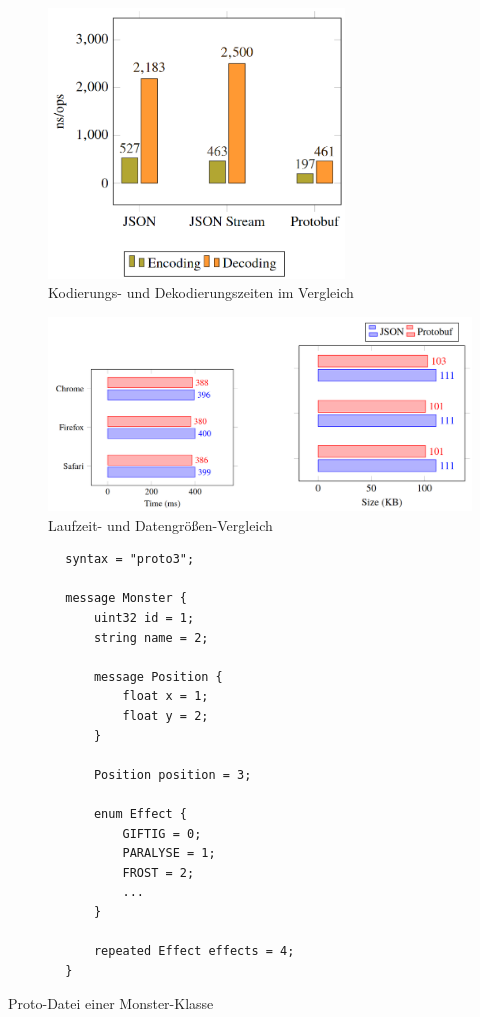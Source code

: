 \begin{figure}[htp]
    \centering
    \includegraphics[width=0.7\textwidth]{images/protobuf_time.png}
    \caption{Kodierungs- und Dekodierungszeiten im Vergleich\cite{currier2022protocol}}
    \label{fig:protobufTime}
\end{figure}

\begin{figure}[htp]
    \centering
    \includegraphics[width=1\textwidth]{images/protobuf_browser.png}
    \caption{Laufzeit- und Datengrößen-Vergleich\cite{currier2022protocol}}
    \label{fig:protobufBrowser}
\end{figure}

\begin{listing}[htp]
    \begin{verbatim} 
        syntax = "proto3";
        
        message Monster {
            uint32 id = 1;
            string name = 2;

            message Position {
                float x = 1;
                float y = 2;
            }

            Position position = 3;

            enum Effect {
                GIFTIG = 0;
                PARALYSE = 1;
                FROST = 2;
                ...
            }

            repeated Effect effects = 4;
        }
    \end{verbatim}
    \caption{Proto-Datei einer Monster-Klasse}
    \label{lst:protoExp}
\end{listing}


